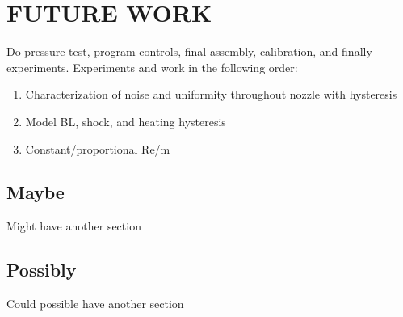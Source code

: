 %
%  
%

\chapter{FUTURE WORK}

Do pressure test, program controls, final assembly, calibration, and finally experiments.
Experiments and work in the following order:
\begin{enumerate}
    \item Characterization of noise and uniformity throughout nozzle with hysteresis
    \item Model BL, shock, and heating hysteresis
    \item Constant/proportional Re/m
\end{enumerate}

\section{Maybe}

Might have another section

\section{Possibly}

Could possible have another section


\nocite{sabnis_corner}
